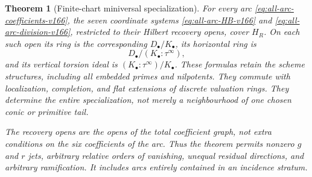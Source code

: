\documentclass[11pt,reqno]{amsart}
\numberwithin{equation}{section}
\newtheorem{theorem}{Theorem}[section]
\theoremstyle{definition}\newtheorem{definition}[theorem]{Definition}
\theoremstyle{remark}\newtheorem{remark}[theorem]{Remark}
\begin{document}
\begin{theorem}[Finite-chart miniversal specialization]
\label{thm:all-arcs-v166}
For every arc \eqref{eq:all-arc-coefficients-v166}, the seven
coordinate systems \eqref{eq:all-arc-HB-v166} and
\eqref{eq:all-arc-division-v166}, restricted to their Hilbert recovery
opens, cover $H_R$. On each such open its ring is the corresponding
$D_\bullet/K_\bullet$, its horizontal ring is
\begin{equation}\label{eq:all-arc-horizontal-v166}
 D_\bullet/(K_\bullet:\tau^\infty),
\end{equation}
and its vertical torsion ideal is
$(K_\bullet:\tau^\infty)/K_\bullet$. These formulas retain the
scheme structures, including all embedded primes and nilpotents.
They commute with localization, completion, and flat extensions of
discrete valuation rings. They determine the entire specialization,
not merely a neighbourhood of one chosen conic or primitive tail.

The recovery opens are the opens of the total coefficient graph,
not extra conditions on the six coefficients of the arc. Thus the
theorem permits nonzero $g$ and $r$ jets, arbitrary relative orders
of vanishing, unequal residual directions, and arbitrary ramification.
It includes arcs entirely contained in an incidence stratum.
\end{theorem}
\end{document}
